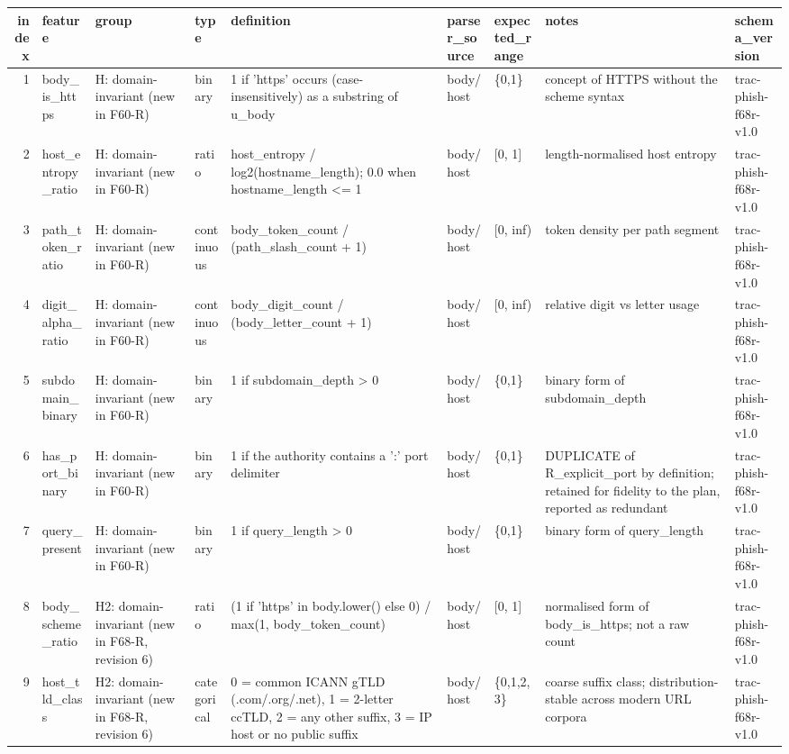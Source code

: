 \begin{tabular}{rllllllll}
\toprule
index & feature & group & type & definition & parser\_source & expected\_range & notes & schema\_version \\
\midrule
1 & body\_is\_https & H: domain-invariant (new in F60-R) & binary & 1 if 'https' occurs (case-insensitively) as a substring of u\_body & body/host & \{0,1\} & concept of HTTPS without the scheme syntax & trac-phish-f68r-v1.0 \\
2 & host\_entropy\_ratio & H: domain-invariant (new in F60-R) & ratio & host\_entropy / log2(hostname\_length); 0.0 when hostname\_length <= 1 & body/host & [0, 1] & length-normalised host entropy & trac-phish-f68r-v1.0 \\
3 & path\_token\_ratio & H: domain-invariant (new in F60-R) & continuous & body\_token\_count / (path\_slash\_count + 1) & body/host & [0, inf) & token density per path segment & trac-phish-f68r-v1.0 \\
4 & digit\_alpha\_ratio & H: domain-invariant (new in F60-R) & continuous & body\_digit\_count / (body\_letter\_count + 1) & body/host & [0, inf) & relative digit vs letter usage & trac-phish-f68r-v1.0 \\
5 & subdomain\_binary & H: domain-invariant (new in F60-R) & binary & 1 if subdomain\_depth > 0 & body/host & \{0,1\} & binary form of subdomain\_depth & trac-phish-f68r-v1.0 \\
6 & has\_port\_binary & H: domain-invariant (new in F60-R) & binary & 1 if the authority contains a ':' port delimiter & body/host & \{0,1\} & DUPLICATE of R\_explicit\_port by definition; retained for fidelity to the plan, reported as redundant & trac-phish-f68r-v1.0 \\
7 & query\_present & H: domain-invariant (new in F60-R) & binary & 1 if query\_length > 0 & body/host & \{0,1\} & binary form of query\_length & trac-phish-f68r-v1.0 \\
8 & body\_scheme\_ratio & H2: domain-invariant (new in F68-R, revision 6) & ratio & (1 if 'https' in body.lower() else 0) / max(1, body\_token\_count) & body/host & [0, 1] & normalised form of body\_is\_https; not a raw count & trac-phish-f68r-v1.0 \\
9 & host\_tld\_class & H2: domain-invariant (new in F68-R, revision 6) & categorical & 0 = common ICANN gTLD (.com/.org/.net), 1 = 2-letter ccTLD, 2 = any other suffix, 3 = IP host or no public suffix & body/host & \{0,1,2,3\} & coarse suffix class; distribution-stable across modern URL corpora & trac-phish-f68r-v1.0 \\

\end{tabular}
